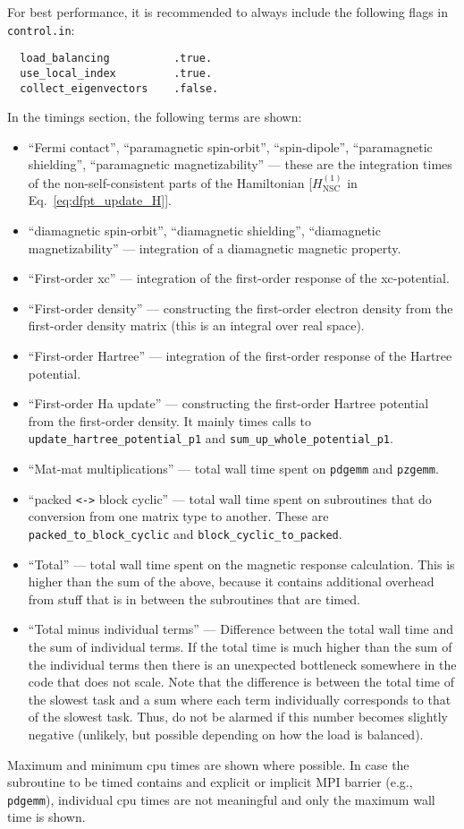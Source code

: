 For best performance, it is recommended to always include the following flags in \texttt{control.in}:
\begin{verbatim}
  load_balancing          .true.
  use_local_index         .true.
  collect_eigenvectors    .false.
\end{verbatim}
In the timings section, the following terms are shown:
\begin{itemize}
\item ``Fermi contact'', ``paramagnetic spin-orbit'', ``spin-dipole'', ``paramagnetic shielding'', ``paramagnetic magnetizability'' --- these are the integration times of the non-self-consistent parts of the Hamiltonian [$H_{\text{NSC}}^{(1)}$ in Eq.~\eqref{eq:dfpt_update_H}].
\item ``diamagnetic spin-orbit'', ``diamagnetic shielding'', ``diamagnetic magnetizability'' --- integration of a diamagnetic magnetic property.
\item ``First-order xc'' --- integration of the first-order response of the xc-potential.
\item ``First-order density'' --- constructing the first-order electron density from the first-order density matrix (this is an integral over real space).
\item ``First-order Hartree'' --- integration of the first-order response of the Hartree potential.
\item ``First-order Ha update'' --- constructing the first-order Hartree potential from the first-order density. It mainly times calls to \verb+update_hartree_potential_p1+ and \verb+sum_up_whole_potential_p1+.
\item ``Mat-mat multiplications'' --- total wall time spent on \texttt{pdgemm} and \texttt{pzgemm}.
\item ``packed \verb+<->+ block cyclic'' --- total wall time spent on subroutines that do conversion from one matrix type to another. These are \verb+packed_to_block_cyclic+ and \verb+block_cyclic_to_packed+.
\item ``Total'' --- total wall time spent on the magnetic response calculation. This is higher than the sum of the above, because it contains additional overhead from stuff that is in between the subroutines that are timed.
\item ``Total minus individual terms'' --- Difference between the total wall time and the sum of individual terms. If the total time is much higher than the sum of the individual terms then there is an unexpected bottleneck somewhere in the code that does not scale. Note that the difference is between the total time of the slowest task and a sum where each term individually corresponds to that of the slowest task. Thus, do not be alarmed if this number becomes slightly negative (unlikely, but possible depending on how the load is balanced).
\end{itemize}
Maximum and minimum cpu times are shown where possible. In case the subroutine to be timed contains and explicit or implicit MPI barrier (e.g., \texttt{pdgemm}), individual cpu times are not meaningful and only the maximum wall time is shown.

